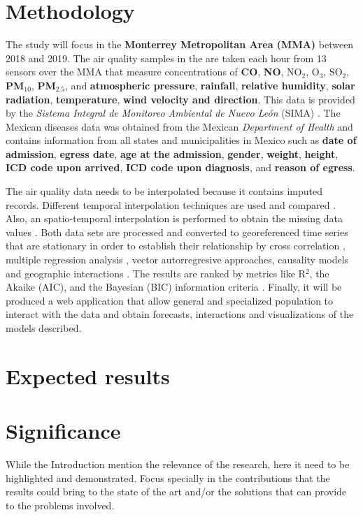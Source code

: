 \documentclass[
  11pt,
  a4paper,
  oneside
]{article}
\begin{document}
\section{Methodology}
The study will focus in the \textbf{Monterrey Metropolitan Area (MMA)} between 2018 and 2019. The air quality samples in the are taken each hour from 13 sensors over the MMA that measure concentrations of \textbf{CO}, \textbf{NO}, \textbf{$\text{NO}_2$}, \textbf{$\text{O}_3$}, \textbf{$\text{SO}_2$}, \textbf{PM$_{10}$}, \textbf{PM$_{2.5}$}, and \textbf{atmospheric pressure}, \textbf{rainfall}, \textbf{relative humidity}, \textbf{solar radiation}, \textbf{temperature}, \textbf{wind velocity and direction}. This data is provided by the \textit{Sistema Integral de Monitoreo Ambiental de Nuevo León} (SIMA) \citep{aireNL}. The Mexican diseases data was obtained from the Mexican \textit{Department of Health} \citep{egresos} and contains information from all states and municipalities in Mexico such as \textbf{date of admission}, \textbf{egress date}, \textbf{age at the admission}, \textbf{gender}, \textbf{weight}, \textbf{height}, \textbf{ICD code upon arrived}, \textbf{ICD code upon diagnosis}, and \textbf{reason of egress}.

The air quality data needs to be interpolated because it contains imputed records. Different temporal interpolation techniques are used and compared \citep{Friedman1962}. Also, an spatio-temporal interpolation is performed to obtain the missing data values \citep{LiEA2002}. Both data sets are processed and converted to georeferenced time series \citep{Wei2019} that are stationary \citep{Hyndman2018} in order to establish their relationship by cross correlation \citep{derrickEA2004}, multiple regression analysis \citep{Brockwell2002}, vector autorregresive approaches, causality models \citep{popescuEA2013} and geographic interactions \citep{ComberEA2019}. The results are ranked by metrics like R$^2$, the Akaike (AIC), and the Bayesian (BIC) information criteria \citep{Albert2007}. Finally, it will be produced a web application that allow general and specialized population to interact with the data and obtain forecasts, interactions and visualizations of the models described.

\section{Expected results}

\section{Significance}
While the Introduction mention the relevance of the research, here it need to be highlighted and demonstrated. Focus specially in the contributions that the results could bring to the state of the art and/or the solutions that can provide to the problems involved.
\end{document}

